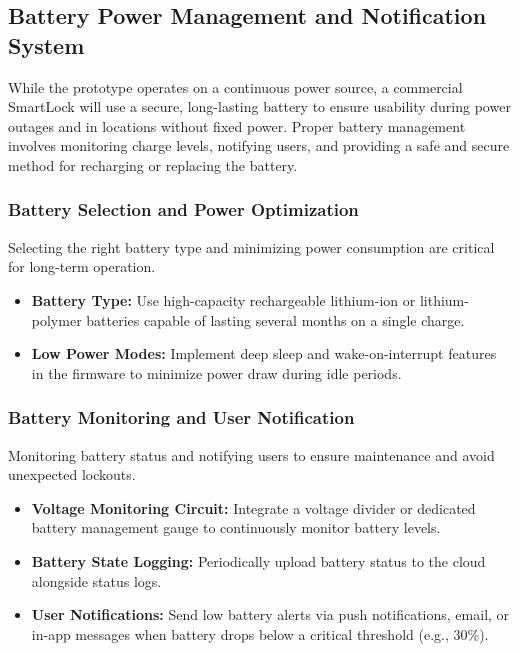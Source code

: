 \subsection{Battery Power Management and Notification System}

While the prototype operates on a continuous power source, a commercial SmartLock will use a secure, long-lasting battery to ensure usability during power outages and in locations without fixed power. Proper battery management involves monitoring charge levels, notifying users, and providing a safe and secure method for recharging or replacing the battery.

\subsubsection{Battery Selection and Power Optimization}

Selecting the right battery type and minimizing power consumption are critical for long-term operation.

\begin{itemize}
  \item \textbf{Battery Type:} Use high-capacity rechargeable lithium-ion or lithium-polymer batteries capable of lasting several months on a single charge.
  \item \textbf{Low Power Modes:} Implement deep sleep and wake-on-interrupt features in the firmware to minimize power draw during idle periods.
\end{itemize}

\subsubsection{Battery Monitoring and User Notification}

Monitoring battery status and notifying users to ensure maintenance and avoid unexpected lockouts.

\begin{itemize}
  \item \textbf{Voltage Monitoring Circuit:} Integrate a voltage divider or dedicated battery management gauge to continuously monitor battery levels.
  \item \textbf{Battery State Logging:} Periodically upload battery status to the cloud alongside status logs.
  \item \textbf{User Notifications:} Send low battery alerts via push notifications, email, or in-app messages when battery drops below a critical threshold (e.g., 30\%).
\end{itemize}

